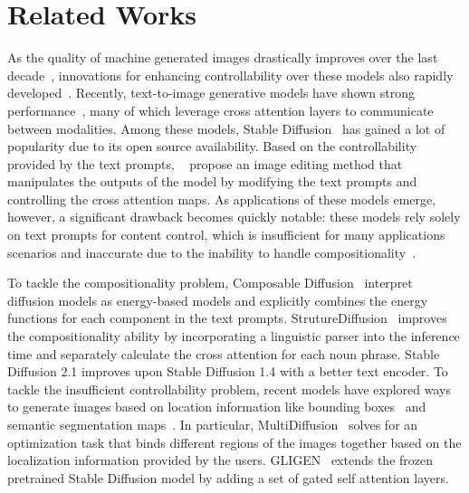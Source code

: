 \section{Related Works}
\label{related_works}
As the quality of machine generated images drastically improves over the last decade~\citep{vae,gan,diffusion,ddpm}, innovations for enhancing controllability over these models also rapidly developed~\citep{cgan,classifier_guided,stylegan,sdedit}.
Recently, text-to-image generative models have shown strong performance~\citep{dalle, imagen, gigagan, glide}, many of which leverage cross attention layers to communicate between modalities. Among these models, Stable Diffusion~\citep{stablediffusion} has gained a lot of popularity due to its open source availability. Based on the controllability provided by the text prompts, ~\citet{prompt2prompt} propose an image editing method that manipulates the outputs of the model by modifying the text prompts and controlling the cross attention maps. As applications of these models emerge, however, a significant drawback becomes quickly notable: these models rely solely on text prompts for content control, which is insufficient for many applications scenarios and inaccurate due to the inability to handle compositionality~\citep{winoground}.

To tackle the compositionality problem, Composable Diffusion~\citep{composablediffusion} interpret diffusion models as energy-based models and explicitly combines the energy functions for each component in the text prompts. StrutureDiffusion~\citep{structurediffusion} improves the compositionality ability by incorporating a linguistic parser into the inference time and separately calculate the cross attention for each noun phrase. Stable Diffusion 2.1 improves upon Stable Diffusion 1.4 with a better text encoder. To tackle the insufficient controllability problem, recent models have explored ways to generate images based on location information like bounding boxes~\citep{layout2image,lostgan} and semantic segmentation maps~\citep{spade,pix2pix}. In particular, MultiDiffusion~\citep{multidiffusion} solves for an optimization task that binds different regions of the images together based on the localization information provided by the users. GLIGEN~\citep{gligen} extends the frozen pretrained Stable Diffusion model by adding a set of gated self attention layers. 

